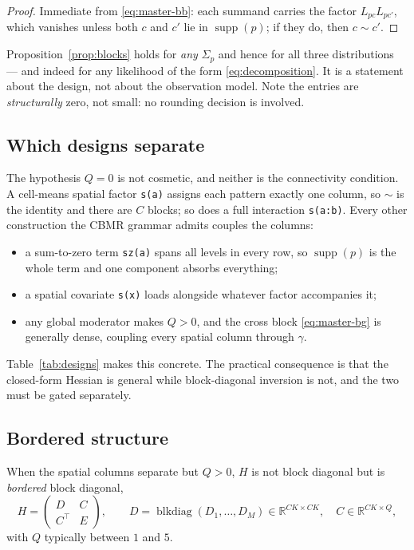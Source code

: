 \documentclass[11pt,a4paper]{article}
\theoremstyle{plain}
\theoremstyle{definition}
\newcommand{\R}{\mathbb{R}}
\newcommand{\supp}{\operatorname{supp}}
\begin{document}
\begin{proof}
Immediate from \eqref{eq:master-bb}: each summand carries the factor $L_{pc}L_{pc'}$, which
vanishes unless both $c$ and $c'$ lie in $\supp(p)$; if they do, then $c \sim c'$.
\end{proof}

Proposition~\ref{prop:blocks} holds for \emph{any} $\Sigma_p$ and hence for all three
distributions --- and indeed for any likelihood of the form \eqref{eq:decomposition}. It is a
statement about the design, not about the observation model. Note the entries are
\emph{structurally} zero, not small: no rounding decision is involved.

\subsection{Which designs separate}

The hypothesis $Q=0$ is not cosmetic, and neither is the connectivity condition. A cell-means
spatial factor \texttt{s(a)} assigns each pattern exactly one column, so $\sim$ is the identity
and there are $C$ blocks; so does a full interaction \texttt{s(a:b)}. Every other construction
the CBMR grammar admits couples the columns:
\begin{itemize}
  \item a sum-to-zero term \texttt{sz(a)} spans all levels in every row, so $\supp(p)$ is the
        whole term and one component absorbs everything;
  \item a spatial covariate \texttt{s(x)} loads alongside whatever factor accompanies it;
  \item any global moderator makes $Q > 0$, and the cross block \eqref{eq:master-bg} is generally
        dense, coupling every spatial column through $\gamma$.
\end{itemize}
Table~\ref{tab:designs} makes this concrete. The practical consequence is that the closed-form
Hessian is general while block-diagonal inversion is not, and the two must be gated separately.

\subsection{Bordered structure}\label{sec:bordered}

When the spatial columns separate but $Q>0$, $H$ is not block diagonal but is \emph{bordered}
block diagonal,
\begin{equation}\label{eq:bordered}
  H = \begin{pmatrix} D & C \\ C^\top & E\end{pmatrix},
  \qquad D = \operatorname{blkdiag}(D_1,\dots,D_M) \in \R^{CK\times CK},\quad C \in \R^{CK\times Q},
\end{equation}
with $Q$ typically between $1$ and $5$.
\end{document}
